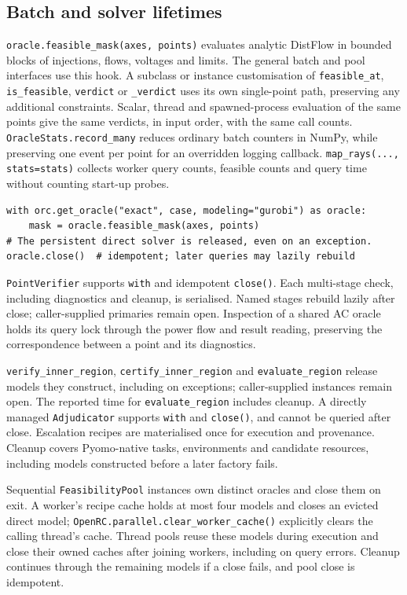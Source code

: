\documentclass[11pt,a4paper]{report}
\newcommand{\code}[1]{\texttt{\small #1}}
\begin{document}
\subsection{Batch and solver lifetimes}

\code{oracle.feasible\_mask(axes, points)} evaluates analytic DistFlow in
bounded blocks of injections, flows, voltages and limits. The general batch
and pool interfaces use this hook. A subclass or instance customisation of
\code{feasible\_at}, \code{is\_feasible}, \code{verdict} or
\code{\_verdict} uses its own single-point path, preserving any additional
constraints. Scalar, thread and spawned-process
evaluation of the same points give the same verdicts, in input order, with the
same call counts.
\code{OracleStats.record\_many} reduces ordinary batch counters in NumPy,
while preserving one event per point for an overridden logging callback.
\code{map\_rays(..., stats=stats)} collects worker query counts,
feasible counts and query time without counting start-up probes.

\begin{lstlisting}
with orc.get_oracle("exact", case, modeling="gurobi") as oracle:
    mask = oracle.feasible_mask(axes, points)
# The persistent direct solver is released, even on an exception.
oracle.close()  # idempotent; later queries may lazily rebuild
\end{lstlisting}

\code{PointVerifier} supports \code{with} and idempotent \code{close()}.
Each multi-stage check, including diagnostics and cleanup, is serialised.
Named stages rebuild lazily after close; caller-supplied primaries remain
open. Inspection of a shared AC oracle holds its query lock through the power
flow and result reading, preserving the correspondence between a point and its
diagnostics.

\code{verify\_inner\_region}, \code{certify\_inner\_region} and
\code{evaluate\_region} release models they construct, including on exceptions;
caller-supplied instances remain open. The reported time for
\code{evaluate\_region} includes cleanup. A directly managed
\code{Adjudicator} supports \code{with} and \code{close()}, and cannot be
queried after close. Escalation recipes are materialised once for execution
and provenance. Cleanup covers Pyomo-native tasks, environments and candidate
resources, including models constructed before a later factory fails.

Sequential \code{FeasibilityPool} instances own distinct oracles and close
them on exit. A worker's recipe cache holds at most four models and closes an
evicted direct model; \code{OpenRC.parallel.clear\_worker\_cache()} explicitly
clears the calling thread's cache. Thread pools reuse these models during
execution and close their owned caches after joining workers, including on
query errors. Cleanup continues through the remaining models if a close fails,
and pool close is idempotent.
\end{document}
